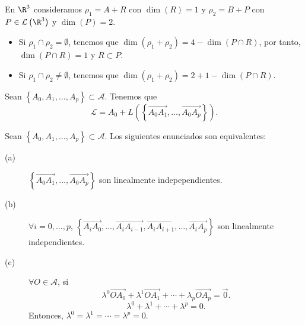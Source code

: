 \begin{eg}
\normalfont En $\displaystyle \R^{3} $ consideramos $\displaystyle \rho_{1} = A + R $ con $\displaystyle \dim\left(R\right)=1 $ y $\displaystyle \rho_{2} = B + P $ con $\displaystyle P \in \mathcal{L}\left(\R^{3}\right) $ y $\displaystyle \dim\left(P\right) = 2 $. 
\begin{itemize}
\item Si $\displaystyle \rho_{1} \cap \rho_{2} = \emptyset $, tenemos que $\displaystyle \dim\left(\rho_{1} + \rho_{2}\right) = 4 - \dim\left(P \cap R\right) $, por tanto, $\displaystyle \dim\left(P \cap R\right) = 1 $ y $\displaystyle R \subset P $.
\item Si $\displaystyle \rho_{1} \cap \rho_{2} \neq \emptyset $, tenemos que $\displaystyle \dim\left(\rho_{1} + \rho_{2}\right) = 2 + 1 - \dim\left(P \cap R\right) $. 
\end{itemize}
\end{eg}
\begin{observation}
\normalfont 
Sean $\displaystyle \left\{ A_{0}, A_{1}, \ldots, A_{p}\right\} \subset \mathcal{A} $. Tenemos que 
\[ \mathcal{L} = A_{0} + L\left( \left\{ \overrightarrow{A_{0}A_{1}}, \ldots, \overrightarrow{A_{0}A_{p}}\right\} \right) .\]
\end{observation}
\begin{fprop}[]
	\normalfont Sean $\displaystyle \left\{ A_{0}, A_{1}, \ldots, A_{p}\right\}  \subset \mathcal{A} $. Los siguientes enunciados son equivalentes:
	\begin{description}
		\item[(a)] $\displaystyle \left\{\overrightarrow{A_{0}A_{1}}, \ldots, \overrightarrow{A_{0}A_{p}}\right\} $ son linealmente indepependientes.
		\item[(b)] $\displaystyle \forall i = 0, \ldots, p $, $\displaystyle \left\{ \overrightarrow{A_{i}A_{0}}, \ldots, \overrightarrow{A_{i}A_{i - 1}}, \overrightarrow{A_{i}A_{i+1}}, \ldots, \overrightarrow{A_{i}A_{p}}\right\}  $ son linealmente independientes.
		\item[(c)] $\displaystyle \forall O \in \mathcal{A} $, si 
			\[ \lambda^{0}\overrightarrow{OA_{0}} + \lambda^{1}\overrightarrow{OA_{1}} + \cdots +\lambda_{p} \overrightarrow{OA_{p}} = \vec{0}.\]
			\[\lambda^{0} + \lambda^{1} + \cdots + \lambda^{p} = 0 .\]
			Entonces, $\displaystyle \lambda^{0}= \lambda^{1} = \cdots = \lambda^{ p}=0 $.
	\end{description}
\end{fprop}
